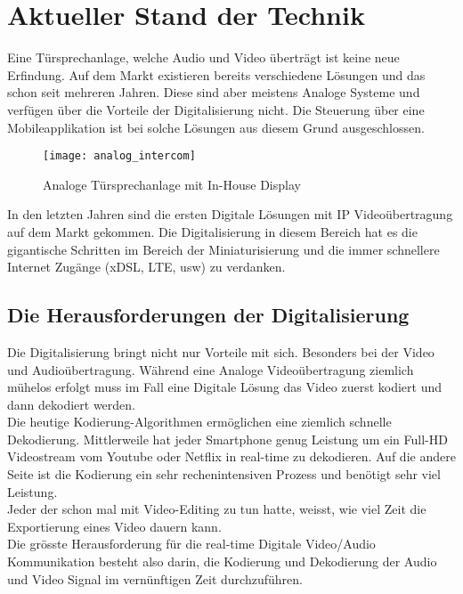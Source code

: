 \section{Aktueller Stand der Technik}
\label{sec:chapterexample}

Eine Türsprechanlage, welche Audio und Video überträgt ist keine neue Erfindung. Auf dem Markt existieren bereits verschiedene Lösungen und das schon seit mehreren Jahren. Diese sind aber meistens Analoge Systeme und verfügen über die Vorteile der Digitalisierung nicht. Die Steuerung über eine Mobileapplikation ist bei solche Lösungen aus diesem Grund ausgeschlossen.

\begin{figure}[htb!]
	\begin{center}
		\texttt{[image: analog\_intercom]}
		\caption[Analoge Türsprechanlage mit In-House Display]{Analoge Türsprechanlage mit In-House Display}
		\label{fig:analoge_intercom}
	\end{center}
\end{figure}

In den letzten Jahren sind die ersten Digitale Lösungen mit IP Videoübertragung auf dem Markt gekommen. Die Digitalisierung in diesem Bereich hat es die gigantische Schritten im Bereich der Miniaturisierung und die immer schnellere Internet Zugänge (xDSL, LTE, usw) zu verdanken.

\subsection{Die Herausforderungen der Digitalisierung}
Die Digitalisierung bringt nicht nur Vorteile mit sich. Besonders bei der Video und Audioübertragung. Während eine Analoge Videoübertragung ziemlich mühelos erfolgt muss im Fall eine Digitale Lösung das Video zuerst kodiert und dann dekodiert werden.
\\
Die heutige Kodierung-Algorithmen ermöglichen eine ziemlich schnelle Dekodierung. Mittlerweile hat jeder Smartphone genug Leistung um ein Full-HD Videostream vom Youtube oder Netflix in real-time zu dekodieren. Auf die andere Seite ist die Kodierung ein sehr rechenintensiven Prozess und benötigt sehr viel Leistung.
\\
Jeder der schon mal mit Video-Editing zu tun hatte, weisst, wie viel Zeit die Exportierung eines Video dauern kann.
\\
Die grösste Herausforderung für die real-time Digitale Video/Audio Kommunikation besteht also darin, die Kodierung und Dekodierung der Audio und Video Signal im vernünftigen Zeit durchzuführen. 


